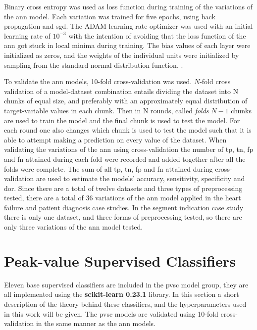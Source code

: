 Binary cross entropy was used as loss function during training of the variations of the \acrshort{ann} model. Each variation was trained for five epochs, using back propagation and \acrshort{sgd}. The ADAM learning rate optimizer was used with an initial learning rate of $10^{-3}$ with the intention of avoiding that the loss function of the \acrshort{ann} got stuck in local minima during training. The bias values of each layer were initialized as zeros, and the weights of the individual units were initialized by sampling from the standard normal distribution function. \bigskip. 

To validate the \acrshort{ann} models, 10-fold cross-validation was used. $N$-fold cross validation of a model-dataset combination entails dividing the dataset into N chunks of equal size, and preferably with an approximately equal distribution of target-variable values in each chunk. Then in N rounds, called \textit{folds} $N-1$ chunks are used to train the model and the final chunk is used to test the model. For each round one also changes which chunk is used to test the model such that it is able to attempt making a prediction on every value of the dataset. When validating the variations of the \acrshort{ann} using cross-validation the number of \acrshort{tp}, \acrshort{tn}, \acrshort{fp} and \acrshort{fn} attained during each fold were recorded and added together after all the folds were complete. The sum of all \acrshort{tp}, \acrshort{tn}, \acrshort{fp} and \acrshort{fn} attained during cross-validation are used to estimate the models' accuracy, sensitivity, specificity and \acrshort{dor}. Since there are a total of twelve datasets and three types of preprocessing tested, there are a total of 36 variations of the \acrshort{ann} model applied in the heart failure and patient diagnosis case studies. In the segment indication case study there is only one dataset, and three forms of preprocessing tested, so there are only three variations of the \acrshort{ann} model tested.

\section{Peak-value Supervised Classifiers} \label{sec:meth_pvsc}

Eleven base supervised classifiers are included in the \acrshort{pvsc} model group, they are all implemented using the \textbf{scikit-learn 0.23.1} library. In this section a short description of the theory behind these classifiers, and the hyperparameters used in this work will be given. The \acrshort{pvsc} models are validated using 10-fold cross-validation in the same manner as the \acrshort{ann} models.

